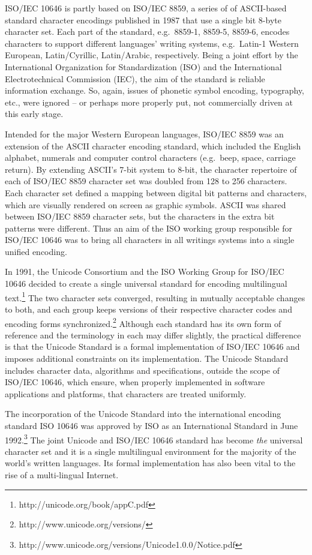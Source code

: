 ISO/IEC 10646 is partly based on ISO/IEC 8859, a series of of ASCII-based 
standard character encodings published in 1987 that use a single bit 8-byte 
character set. Each part of the standard, e.g.\ 8859-1, 8859-5, 8859-6, 
encodes characters to support different languages' writing systems, e.g.\ 
Latin-1 Western European, Latin/Cyrillic, Latin/Arabic, respectively. Being 
a joint effort by the International Organization for Standardization (ISO) 
and the International Electrotechnical Commission (IEC), the aim of the 
standard is reliable information exchange. So, again, issues of phonetic 
symbol encoding, typography, etc., were ignored -- or perhaps more properly 
put, not commercially driven at this early stage.

Intended for the major Western European languages, ISO/IEC 8859 was an 
extension of the ASCII character encoding standard, which included the 
English alphabet, numerals and computer control characters (e.g.\ beep, 
space, carriage return). By extending ASCII's 7-bit system to 8-bit, the 
character repertoire of each of ISO/IEC 8859 character set was doubled 
from 128 to 256 characters. Each character set defined a mapping between 
digital bit patterns and characters, which are visually rendered on screen 
as graphic symbols. ASCII was shared between ISO/IEC 8859 character sets, 
but the characters in the extra bit patterns were different. Thus an aim 
of the ISO working group responsible for ISO/IEC 10646 was to bring all 
characters in all writings systems into a single unified encoding.

In 1991, the Unicode Consortium and the ISO Working Group for ISO/IEC 10646 
decided to create a single universal standard for encoding multilingual text.\footnote{http://unicode.org/book/appC.pdf} 
The two character sets converged, resulting in mutually acceptable changes 
to both, and each group keeps versions of their respective character codes 
and encoding forms synchronized.\footnote{http://www.unicode.org/versions/} 
Although each standard has its own form of reference and the terminology in 
each may differ slightly, the practical difference is that the Unicode Standard 
is a formal implementation of ISO/IEC 10646 and imposes additional constraints 
on its implementation. The Unicode Standard includes character data, algorithms 
and specifications, outside the scope of ISO/IEC 10646, which ensure, when 
properly implemented in software applications and platforms, that characters 
are treated uniformly. 

The incorporation of the Unicode Standard into the international encoding 
standard ISO 10646 was approved by ISO as an International Standard in June 
1992.\footnote{http://www.unicode.org/versions/Unicode1.0.0/Notice.pdf} 
The joint Unicode and ISO/IEC 10646 standard has become \textit{the} universal 
character set and it is a single multilingual environment for the majority 
of the world's written languages. Its formal implementation has also been 
vital to the rise of a multi-lingual Internet.


